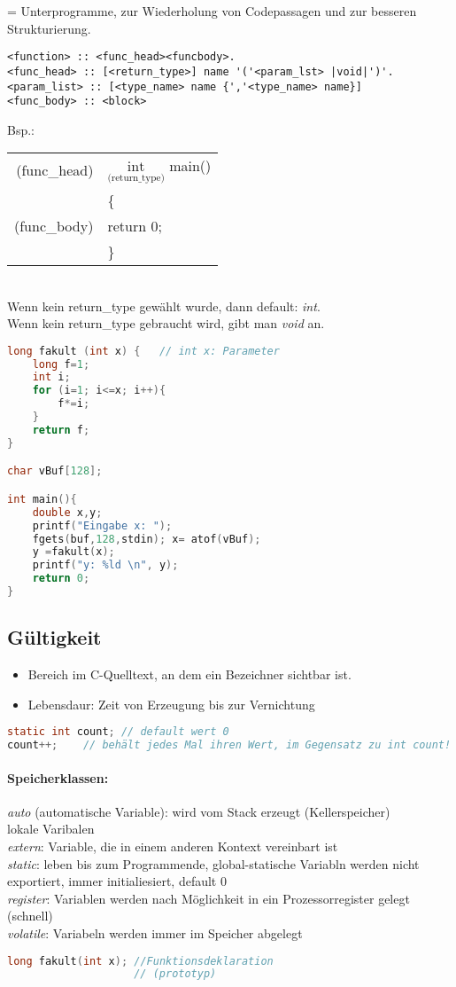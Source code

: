= Unterprogramme, zur Wiederholung von Codepassagen und zur besseren Strukturierung.
\begin{lstlisting}
<function> :: <func_head><funcbody>.
<func_head> :: [<return_type>] name '('<param_lst> |void|')'.
<param_list> :: [<type_name> name {','<type_name> name}]
<func_body> :: <block>
\end{lstlisting}
Bsp.:\\
\begin{tabular}{r l}
(func\_head) & $\underset{\text{(return\_type)}}{\text{int}}$ main()\\
 & \{ \\
(func\_body) & return 0;\\
& \} \\
\end{tabular}\\
Wenn kein return\_type gewählt wurde, dann default: \emph{int}.\\
Wenn kein return\_type gebraucht wird, gibt man \emph{void} an.
\begin{lstlisting}[language=C]
long fakult (int x) {	// int x: Parameter
	long f=1;
	int i;
	for (i=1; i<=x; i++){
		f*=i;
	}
	return f;
}

char vBuf[128];

int main(){
	double x,y;
	printf("Eingabe x: ");
	fgets(buf,128,stdin); x= atof(vBuf);
	y =fakult(x);
	printf("y: %ld \n", y);
	return 0;
}
\end{lstlisting}

\subsection{Gültigkeit}
\begin{itemize}
\item Bereich im C-Quelltext, an dem ein Bezeichner sichtbar ist.
\item Lebensdaur: Zeit von Erzeugung bis zur Vernichtung
\end{itemize}
\begin{lstlisting}[language = C]
static int count; // default wert 0
count++;	// behält jedes Mal ihren Wert, im Gegensatz zu int count!
\end{lstlisting}
\paragraph{Speicherklassen:}\parskp
\emph{auto} (automatische Variable): wird vom Stack erzeugt (Kellerspeicher)\\
lokale Varibalen\\
\emph{extern}: Variable, die in einem anderen Kontext vereinbart ist\\
\emph{static}: leben bis zum Programmende, global-statische Variabln werden nicht exportiert, immer initialiesiert, default 0\\
\emph{register}: Variablen werden nach Möglichkeit in ein Prozessorregister gelegt (schnell)\\
\emph{volatile}: Variabeln werden immer im Speicher abgelegt
\begin{lstlisting}[language=C]
long fakult(int x);	//Funktionsdeklaration
					// (prototyp)
\end{lstlisting}

